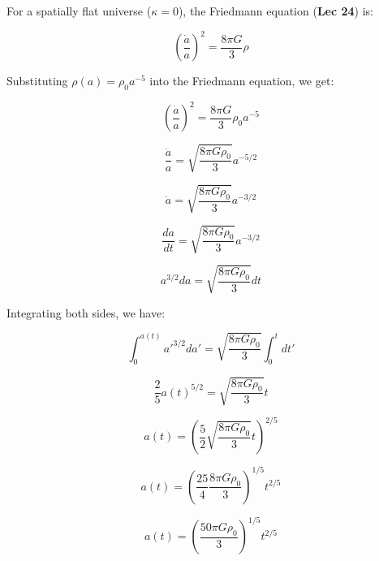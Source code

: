\documentclass{article}
\begin{document}
For a spatially flat universe ($\kappa = 0$), the Friedmann equation (\textbf{Lec 24}) is:

\begin{equation} \label{eq:friedmann}
\left(\frac{\dot{a}}{a}\right)^2 = \frac{8\pi G}{3}\rho
\end{equation}

Substituting $\rho(a) = \rho_0 a^{-5}$ into the Friedmann equation, we get:

\begin{equation}
\left(\frac{\dot{a}}{a}\right)^2 = \frac{8\pi G}{3} \rho_0 a^{-5}
\end{equation}

\begin{equation}
\frac{\dot{a}}{a} = \sqrt{\frac{8\pi G \rho_0}{3}} a^{-5/2}
\end{equation}

\begin{equation}
\dot{a} = \sqrt{\frac{8\pi G \rho_0}{3}} a^{-3/2}
\end{equation}

\begin{equation}
\frac{da}{dt} = \sqrt{\frac{8\pi G \rho_0}{3}} a^{-3/2}
\end{equation}

\begin{equation}
a^{3/2} da = \sqrt{\frac{8\pi G \rho_0}{3}} dt
\end{equation}

Integrating both sides, we have:

\begin{equation}
\int_{0}^{a(t)} a'^{3/2} da' = \sqrt{\frac{8\pi G \rho_0}{3}} \int_{0}^{t} dt'
\end{equation}

\begin{equation}
\frac{2}{5}a(t)^{5/2} = \sqrt{\frac{8\pi G \rho_0}{3}} t
\end{equation}

\begin{equation}
a(t) = \left(\frac{5}{2}\sqrt{\frac{8\pi G \rho_0}{3}} t\right)^{2/5}
\end{equation}

\begin{equation}
a(t) = \left(\frac{25}{4}\frac{8\pi G \rho_0}{3}\right)^{1/5} t^{2/5}
\end{equation}

\begin{equation}
a(t) = \left(\frac{50\pi G \rho_0}{3}\right)^{1/5} t^{2/5}
\end{equation}
\end{document}
